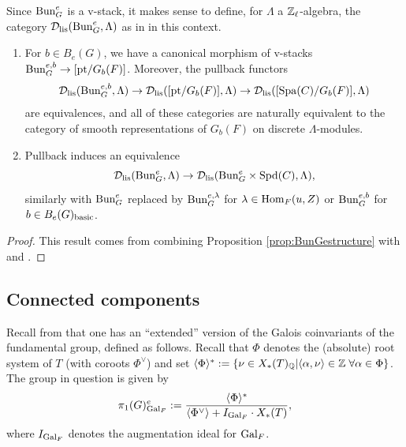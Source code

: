 Since $\mathrm{Bun}_{G}^{e}$ is a v-stack, it makes sense to define, for $\Lambda$ a $\mathbb{Z}_{\ell}$-algebra, the category $\mathcal{D}_{\textnormal{lis}}(\mathrm{Bun}_{G}^{e}, \Lambda)$ as in \cite[Definition VII.6.1]{Geometrization} in this context.

\begin{corol}\label{cor:Dlise}
\begin{enumerate}
\item{For $b \in B_{e}(G)$, we have a canonical morphism of v-stacks $\mathrm{Bun}_{G}^{e,b} \to [\mathrm{pt}/G_{b}(F)]$. Moreover, the pullback functors
\begin{equation*}
    \mathcal{D}_{\textnormal{lis}}(\mathrm{Bun}_{G}^{e,b}, \Lambda) \to \mathcal{D}_{\textnormal{lis}}([\mathrm{pt}/G_{b}(F)], \Lambda) \to \mathcal{D}_{\textnormal{lis}}([\mathrm{Spa}(C)/G_{b}(F)], \Lambda)
\end{equation*}
are equivalences, and all of these categories are naturally equivalent to the category of smooth representations of $G_{b}(F)$ on discrete $\Lambda$-modules.}
\item{Pullback induces an equivalence
\begin{equation*}
\mathcal{D}_{\textnormal{lis}}(\mathrm{Bun}_{G}^{e}, \Lambda) \to \mathcal{D}_{\textnormal{lis}}(\mathrm{Bun}_{G}^{e} \times \mathrm{Spd}(C), \Lambda),
\end{equation*}
similarly with $\mathrm{Bun}_{G}^{e}$ replaced by $\mathrm{Bun}_{G}^{e,\lambda}$ for $\lambda \in \mathrm{Hom}_{F}(u,Z)$ or $\mathrm{Bun}_{G}^{e,b}$ for $b \in B_{e}(G)_{\textnormal{basic}}$.
}
\end{enumerate}
\end{corol}

\begin{proof}
    This result comes from combining Proposition \ref{prop:BunGestructure} with \cite[Proposition VII.7.1]{Geometrization} and \cite[Proposition VIII.7.3]{Geometrization}.
\end{proof}

\subsection{Connected components}
Recall from \cite[D\'{e}finition 9.10]{Fargues22} that one has an ``extended'' version of the Galois coinvariants of the fundamental group, defined as follows. Recall that $\Phi$ denotes the (absolute) root system of $T$ (with coroots $\Phi^{\vee}$) and set $\langle \Phi \rangle^{*} := \{\nu \in X_{*}(T)_{\mathbb{Q}} | \langle \alpha, \nu \rangle \in \mathbb{Z} \hspace{1mm} \forall \alpha \in \Phi\}$. The group in question is given by
\begin{equation*}
\pi_{1}(G)^{e}_{\mathrm{Gal}_{F}} := \frac{\langle \Phi \rangle^{*}}{\langle \Phi^{\vee} \rangle + I_{\mathrm{Gal}_{F}} \cdot X_{*}(T)},
\end{equation*}
where $I_{\mathrm{Gal}_{F}}$ denotes the augmentation ideal for $\mathrm{Gal}_{F}$.

